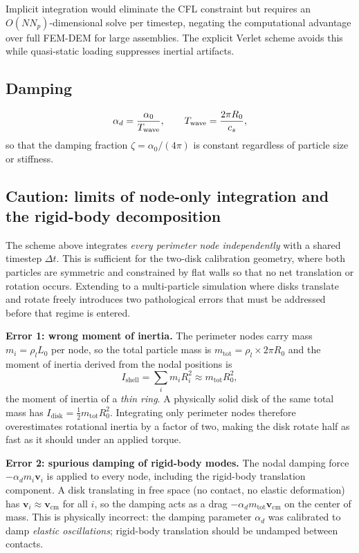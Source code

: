 \documentclass[aps,pre,twocolumn,floatfix,longbibliography]{revtex4-2}
\begin{document}
Implicit integration would eliminate the CFL constraint but requires an
$O(N N_p)$-dimensional solve per timestep, negating the computational advantage
over full FEM-DEM for large assemblies.  The explicit Verlet scheme avoids this
while quasi-static loading suppresses inertial artifacts.

\subsection{Damping}

\begin{equation}
  \alpha_d = \frac{\alpha_0}{T_{\rm wave}},
  \qquad
  T_{\rm wave} = \frac{2\pi R_0}{c_s},
\label{eq:damp}
\end{equation}
so that the damping fraction $\zeta = \alpha_0/(4\pi)$ is constant regardless
of particle size or stiffness.

\subsection{Caution: limits of node-only integration and the rigid-body
decomposition}
\label{sec:rigidlimit}

The scheme above integrates \emph{every perimeter node independently} with a
shared timestep $\Delta t$.  This is sufficient for the two-disk calibration
geometry, where both particles are symmetric and constrained by flat walls so
that no net translation or rotation occurs.  Extending to a multi-particle
simulation where disks translate and rotate freely introduces two pathological
errors that must be addressed before that regime is entered.

\textbf{Error 1: wrong moment of inertia.}
The perimeter nodes carry mass $m_i = \rho_l L_0$ per node, so the total
particle mass is $m_\text{tot} = \rho_l \times 2\pi R_0$ and the moment of
inertia derived from the nodal positions is
\begin{equation}
  I_\text{shell} = \sum_i m_i R_i^2 \approx m_\text{tot} R_0^2,
\label{eq:Ishell}
\end{equation}
the moment of inertia of a \emph{thin ring}.  A physically solid disk of the
same total mass has $I_\text{disk} = \tfrac{1}{2} m_\text{tot} R_0^2$.
Integrating only perimeter nodes therefore overestimates rotational inertia by
a factor of two, making the disk rotate half as fast as it should under an
applied torque.

\textbf{Error 2: spurious damping of rigid-body modes.}
The nodal damping force $-\alpha_d m_i \mathbf{v}_i$ is applied to every node,
including the rigid-body translation component.  A disk translating in free
space (no contact, no elastic deformation) has
$\mathbf{v}_i \approx \mathbf{v}_\text{cm}$ for all $i$, so the damping acts
as a drag $-\alpha_d m_\text{tot} \mathbf{v}_\text{cm}$ on the center of mass.
This is physically incorrect: the damping parameter $\alpha_d$ was calibrated
to damp \emph{elastic oscillations}; rigid-body translation should be undamped
between contacts.
\end{document}
